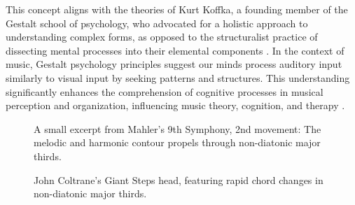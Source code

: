 This concept aligns with the theories of Kurt Koffka, a founding member of the Gestalt school of psychology, who advocated for a holistic approach to understanding complex forms, as opposed to the structuralist practice of dissecting mental processes into their elemental components \cite{Koffka2013PrinciplesPsychology}. In the context of music, Gestalt psychology principles suggest our minds process auditory input similarly to visual input by seeking patterns and structures. This understanding significantly enhances the comprehension of cognitive processes in musical perception and organization, influencing music theory, cognition, and therapy \cite{Lerdahl1985AMusic}.

\begin{figure}[ht]
    \centering
    \caption[Mahler's 9th Symphony, 2nd movement]{\small{A small excerpt from Mahler's 9th Symphony, 2nd movement: The melodic and harmonic contour propels through non-diatonic major thirds.}}
    \label{fig:mahler}
\end{figure}

\begin{figure}[ht]
    \centering
    \caption[Giant Steps]{\small{John Coltrane's Giant Steps head, featuring rapid chord changes in non-diatonic major thirds.}}
    \label{fig:giant_steps}
\end{figure}


